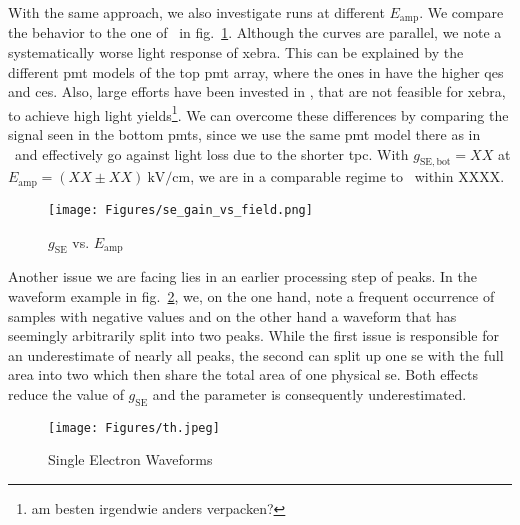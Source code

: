 With the same approach, we also investigate runs at different $ E_\mathrm{amp} $.
We compare the behavior to the one of \oneton~in fig.~\ref{fig:seg-vs-field}.
Although the curves are parallel, we note a systematically worse light response of \gls{xebra}.
This can be explained by the different \gls{pmt} models of the top \gls{pmt} array, where the ones in \oneton have the higher \glspl{qe} and \glspl{ce}.
Also, large efforts have been invested in \oneton, that are not feasible for \gls{xebra}, to achieve high light yields\footnote{am besten irgendwie anders verpacken?}.
We can overcome these differences by comparing the signal seen in the bottom \glspl{pmt}, since we use the same \gls{pmt} model there as in \oneton~and effectively go against light loss due to the shorter \gls{tpc}.
With $ g_\mathrm{SE, bot} = XX $ at $ E_\mathrm{amp} = \left( XX \pm XX \right) \SI{}{\kilo\volt\per\centi\meter} $, we are in a comparable regime to \oneton~within XXXX.  %


\begin{figure}
    \centering
    \texttt{[image: Figures/se\_gain\_vs\_field.png]}  %
    \caption[\oneton~comparison of Amplification Gain vs. Fieldstrength]{
        $ g_\mathrm{SE} $ vs. $ E_\mathrm{amp} $
    }
    \label{fig:seg-vs-field}
\end{figure}


Another issue we are facing lies in an earlier processing step of peaks.
In the waveform example in fig.~\ref{fig:waveforms-se}, we, on the one hand, note a frequent occurrence of samples with negative values and on the other hand a waveform that has seemingly arbitrarily split into two peaks.
While the first issue is responsible for an underestimate of nearly all peaks, the second can split up one \gls{se} with the full area into two which then share the total area of one physical \gls{se}.
Both effects reduce the value of $ g_\mathrm{SE} $ and the parameter is consequently underestimated.


\begin{figure}
    \centering
    \texttt{[image: Figures/th.jpeg]}  %
    \caption[Single Electrons Waveforms]{
        Single Electron Waveforms
    }
    \label{fig:waveforms-se}
\end{figure}


